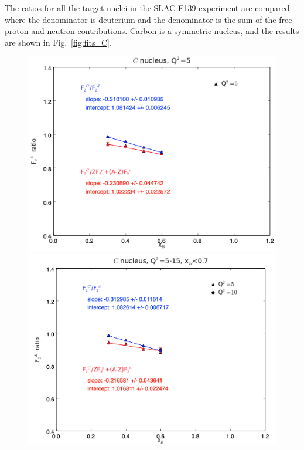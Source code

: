 \documentclass[oneside]{article}
\begin{document}
The ratios for all the target nuclei in the SLAC E139 experiment are compared where the denominator is deuterium and the denominator is the sum of the free proton and neutron contributions. Carbon is a symmetric nucleus, and the results are shown in Fig.~\ref{fig:fits_C}. 

 \begin{figure}
\begin{minipage}{0.5\textwidth}
 \includegraphics[width=\textwidth]{plots/q2_5/q2_5_C.png}
\end{minipage}\hfill\begin{minipage}{0.5\textwidth}
\includegraphics[width=\textwidth]{plots/q2_all_x_l7/q2_all_x_l7_C.png}

\end{minipage}
\end{figure}
\end{document}
